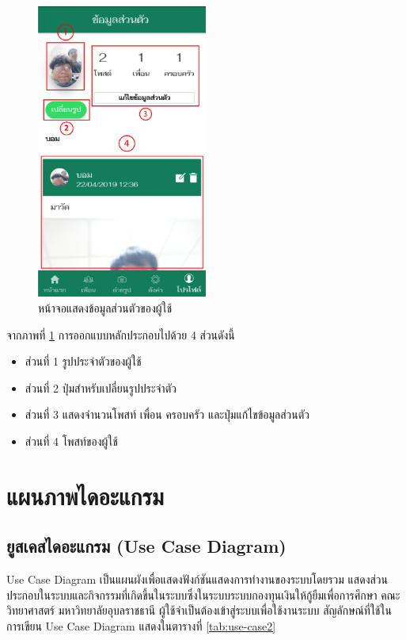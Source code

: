 		\begin{figure}[H]
			\centering
			\includegraphics[width=0.5\textwidth]{Figures/3/UI/profile}
			\caption{หน้าจอแสดงข้อมูลส่วนตัวของผู้ใช้}
			\label{Fig:โปรไฟล์}
		\end{figure}
		จากภาพที่ \ref{Fig:โปรไฟล์} การออกแบบหลักประกอบไปด้วย 4 ส่วนดังนี้
		\begin{itemize}
			\item ส่วนที่ 1 รูปประจำตัวของผู้ใช้
			\item ส่วนที่ 2 ปุ่มสำหรับเปลี่ยนรูปประจำตัว
			\item ส่วนที่ 3 แสดงจำนวนโพสท์ เพื่อน ครอบครัว และปุ่มแก้ไขข้อมูลส่วนตัว
			\item ส่วนที่ 4 โพสท์ของผู้ใช้
		\end{itemize}
\newpage


\section{แผนภาพไดอะแกรม}


\subsection{ยูสเคสไดอะแกรม (Use Case Diagram)}

	Use Case Diagram เป็นแผนผังเพื่อแสดงฟังก์ชันแสดงการทำงานของระบบโดยรวม แสดงส่วนประกอบในระบบและกิจกรรมที่เกิดขึ้นในระบบซึ่งในระบบระบบกองทุนเงินให้กู้ยืมเพื่อการศึกษา คณะวิทยาศาสตร์ มหาวิทยาลัยอุบลราชธานี ผู้ใช้จำเป็นต้องเข้าสู่ระบบเพื่อใช้งานระบบ สัญลักษณ์ที่ใช้ในการเขียน Use Case Diagram แสดงในตารางที่ \ref{tab:use-case2}

